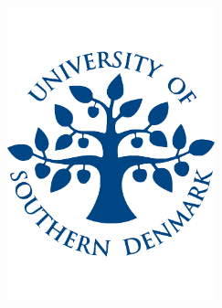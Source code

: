 
\begin{titlepage}

	\begin{center}
	\includegraphics[width=60mm,keepaspectratio]{figures/sdu_logo}\\

	\vspace{0.3cm}
	\textbf{\institute}\\

	\textmd{\department}\\
	\textmd{\program}  %


\end{center}
\end{titlepage}
